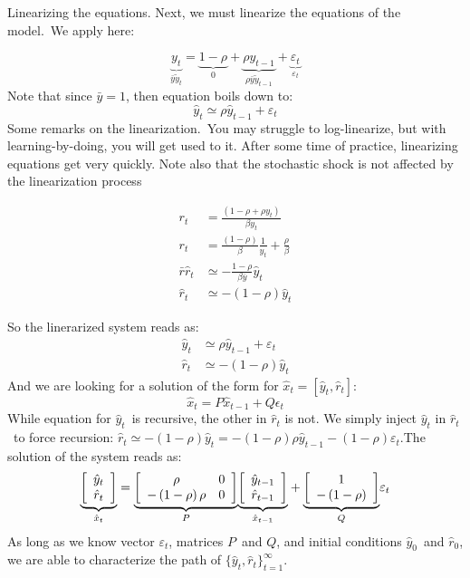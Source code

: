 \documentclass[a4paper,12pt]{article}%
\begin{document}
\textsf{Linearizing the equations. }Next, we must linearize the equations of
the model.\ We apply here:\textsf{\ }%

\[
\underset{\bar{y}\tilde{y}_{t}}{\underbrace{y_{t}}}=\underset{0}%
{\underbrace{1-\rho}}+\underset{\rho\bar{y}\tilde{y}_{t-1}}{\underbrace{\rho
y_{t-1}}}+\underset{\varepsilon_{t}}{\underbrace{\varepsilon_{t}}}%
\]
Note that since $\bar{y}=1$, then equation boils down to:%
\[
\hat{y}_{t}\simeq\rho\hat{y}_{t-1}+\varepsilon_{t}%
\]
Some remarks on the linearization.\ You may struggle to log-linearize, but
with learning-by-doing, you will get used to it. After some time of practice,
linearizing equations get very quickly. Note also that the stochastic shock is
not affected by the linearization process%

\begin{align*}
r_{t}  &  =\frac{\left(  1-\rho+\rho y_{t}\right)  }{\beta y_{t}}\\
r_{t}  &  =\frac{\left(  1-\rho\right)  }{\beta}\frac{1}{y_{t}}+\frac{\rho
}{\beta}\\
\bar{r}\hat{r}_{t}  &  \simeq-\frac{1-\rho}{\beta\bar{y}}\hat{y}_{t}\\
\hat{r}_{t}  &  \simeq-\left(  1-\rho\right)  \hat{y}_{t}%
\end{align*}


So the linerarized system reads as:%
\begin{align*}
\hat{y}_{t}  &  \simeq\rho\hat{y}_{t-1}+\varepsilon_{t}\\
\hat{r}_{t}  &  \simeq-\left(  1-\rho\right)  \hat{y}_{t}%
\end{align*}
And we are looking for a solution of the form for $\hat{x}_{t}=[\hat{y}%
_{t},\hat{r}_{t}]$:%
\[
\hat{x}_{t}=P\hat{x}_{t-1}+Q\epsilon_{t}%
\]
While equation for $\hat{y}_{t}$\ is recursive, the other in $\hat{r}_{t}$ is
not. We simply inject $\hat{y}_{t}$ in $\hat{r}_{t}$\ to force recursion:
$\hat{r}_{t}\simeq-\left(  1-\rho\right)  \hat{y}_{t}=-\left(  1-\rho\right)
\rho\hat{y}_{t-1}-\left(  1-\rho\right)  \varepsilon_{t}.$The solution of the
system reads as:%
\[
\underset{\hat{x}_{t}}{\underbrace{\left[
\begin{array}
[c]{c}%
\hat{y}_{t}\\
\hat{r}_{t}%
\end{array}
\right]  }}=\underset{P}{\underbrace{\left[
\begin{array}
[c]{cc}%
\rho & 0\\
-\left(  1-\rho\right)  \rho & 0
\end{array}
\right]  }}\underset{\hat{x}_{t-1}}{\underbrace{\left[
\begin{array}
[c]{c}%
\hat{y}_{t-1}\\
\hat{r}_{t-1}%
\end{array}
\right]  }}+\underset{Q}{\underbrace{\left[
\begin{array}
[c]{c}%
1\\
-\left(  1-\rho\right)
\end{array}
\right]  }}\varepsilon_{t}%
\]
As long as we know vector $\varepsilon_{t}$, matrices $P$\ and $Q$, and
initial conditions $\hat{y}_{0}$\ and $\hat{r}_{0}$, we are able to
characterize the path of $\{\hat{y}_{t},\hat{r}_{t}\}_{t=1}^{\infty}$.%
\end{document}
